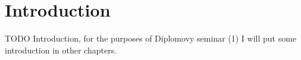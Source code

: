 \chapter*{Introduction}

TODO Introduction, for the purposes of Diplomovy seminar (1) I will put some 
introduction in other chapters.
